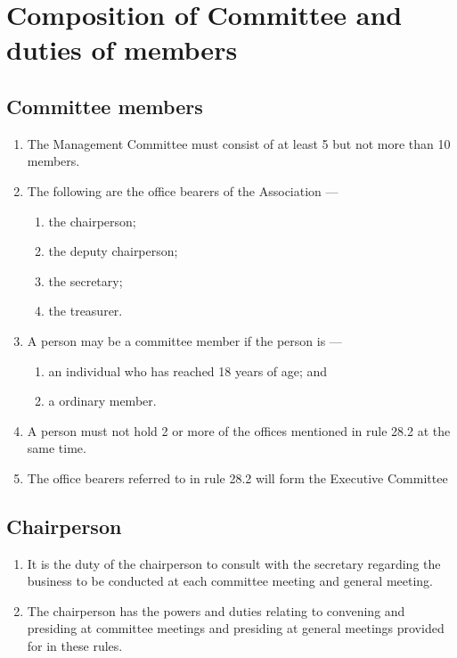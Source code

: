 \documentclass[../constitution.tex]{subfiles}
\begin{document}
\hypertarget{division-2-composition-of-committee-and-duties-of-members}{%
\section{Composition of Committee and duties of members}\label{division-2-composition-of-committee-and-duties-of-members}}

\hypertarget{committee-members}{%
\subsection{Committee members}\label{committee-members}}

\begin{enumerate}

\item The Management Committee must consist of at least 5 but not more than 10 members.
\item The following are the office bearers of the Association ---

  \begin{enumerate}
  
  \item the chairperson;
  \item the deputy chairperson;
  \item the secretary;
  \item the treasurer.
  \end{enumerate}
\item A person may be a committee member if the person is ---

  \begin{enumerate}
  
  \item an individual who has reached 18 years of age; and
  \item a ordinary member.
  \end{enumerate}
\item A person must not hold 2 or more of the offices mentioned in rule 28.2 at the same time.
\item The office bearers referred to in rule 28.2 will form the Executive Committee
\end{enumerate}

\hypertarget{chairperson}{%
\subsection{Chairperson}\label{chairperson}}

\begin{enumerate}

\item It is the duty of the chairperson to consult with the secretary regarding the business to be conducted at each committee meeting and general meeting.
\item The chairperson has the powers and duties relating to convening and presiding at committee meetings and presiding at general meetings provided for in these rules.
\end{enumerate}
\end{document}
